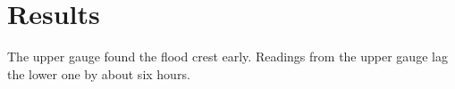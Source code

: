 \section{Results}
The upper gauge found the flood crest early. Readings from the upper gauge lag the lower one by about six hours.
